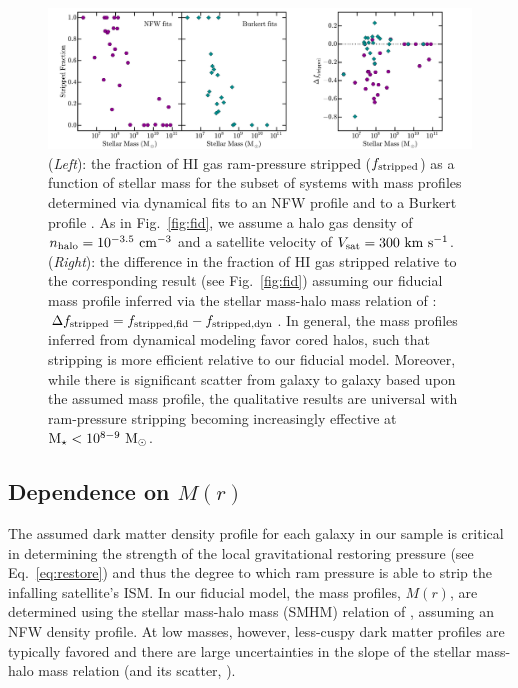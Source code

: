\begin{figure}
 \centering
 \hspace*{-0.25in}
   \includegraphics[width=6in]{underpressure/f4.pdf}
   \caption[Ram-Pressure stripping efficiency based on dynamically modeled halos]{(\emph{Left}): the fraction of H{\scriptsize I} gas
     ram-pressure stripped ($f_{\rm stripped}$) as a function of
     stellar mass for the subset of systems with mass profiles
     determined via dynamical fits to an NFW profile \citep{deblok08,
       oh15} and to a Burkert profile \citep{pace16}. As in
     Fig.~\ref{fig:fid}, we assume a halo gas density of $n_{\rm
       halo}=10^{-3.5}~{\rm cm}^{-3}$ and a satellite velocity of
     $V_{\rm sat}=300~{\rm km}~{\rm s}^{-1}$. (\emph{Right}): the
     difference in the fraction of H{\scriptsize I} gas stripped
     relative to the corresponding result (see Fig.~\ref{fig:fid})
     assuming our fiducial mass profile inferred via the stellar
     mass-halo mass relation of \citet{gk14}: ${\Delta}f_{\rm
       stripped} = f_{\rm stripped, fid} - f_{\rm stripped, dyn}$. In
     general, the mass profiles inferred from dynamical modeling favor
     cored halos, such that stripping is more efficient relative to
     our fiducial model. Moreover, while there is significant scatter
     from galaxy to galaxy based upon the assumed mass profile, the
     qualitative results are universal with ram-pressure stripping
     becoming increasingly effective at ${\rm M}_{\star}<10^{8-9}~{\rm M}_{\odot}$. }
 \label{fig:mass}
\end{figure}
 


\subsection{Dependence on \boldmath$M(r)$}
\label{subsec:dMr}

The assumed dark matter density profile for each galaxy in our sample
is critical in determining the strength of the local gravitational
restoring pressure (see Eq.~\ref{eq:restore}) and thus the degree to
which ram pressure is able to strip the infalling satellite's ISM.
%
In our fiducial model, the mass profiles, $M(r)$, are determined using
the stellar mass-halo mass (SMHM) relation of \citet{gk14}, assuming
an NFW density profile.
%
At low masses, however, less-cuspy dark matter profiles are typically
favored and there are large uncertainties in the slope of the stellar
mass-halo mass relation (and its scatter, \citealt{gk16}).
%

